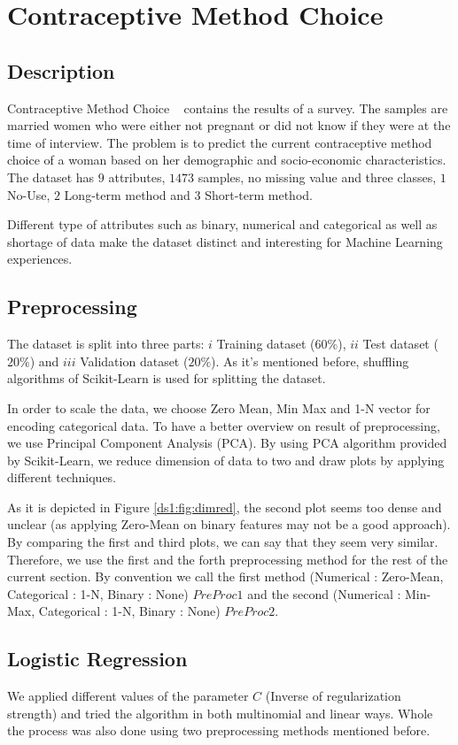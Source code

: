 \section{Contraceptive Method Choice}
\label{db:sec:ds1}
\subsection{Description}
Contraceptive Method Choice ~\cite{ds1:uci} contains the results of a survey.
The samples are married women who were either not pregnant or did not know if
they were at the time of interview. The problem is to predict the current
contraceptive method choice of a woman based on her demographic and
socio-economic characteristics. The dataset has $9$ attributes, $1473$
samples, no missing value and three classes, $1$
No-Use, $2$ Long-term method and $3$ Short-term method.

Different type of attributes such as binary, numerical and categorical as well as shortage of data make the dataset distinct and interesting for Machine Learning experiences.

\subsection{Preprocessing}
The dataset is split into three parts: $i$ Training dataset ($60\%$), $ii$ Test dataset ($20\%$) and $iii$ Validation dataset ($20\%$). As it's mentioned before, shuffling algorithms of Scikit-Learn is used for splitting the dataset.

In order to scale the data, we choose Zero Mean, Min Max and 1-N vector for
encoding categorical data. To have a better overview on result of preprocessing,
we use Principal Component Analysis (PCA). By using PCA algorithm provided by Scikit-Learn, we reduce dimension of data to two and draw plots by applying different techniques.

As it is depicted in Figure \ref{ds1:fig:dimred}, the second plot seems too dense and unclear (as applying Zero-Mean on binary features may not be a good approach). By comparing the first and third plots, we can say that they seem very similar. Therefore, we use the first and the forth preprocessing method for the rest of the current section. By convention we call the first method (Numerical : Zero-Mean, Categorical : 1-N, Binary : None) $PreProc1$ and the second (Numerical : Min-Max, Categorical : 1-N, Binary : None) $PreProc2$.


\subsection{Logistic Regression}
We applied different values of the parameter $C$ (Inverse of regularization strength) and tried the algorithm in both multinomial and linear ways. Whole the process was also done using two preprocessing methods mentioned before.

